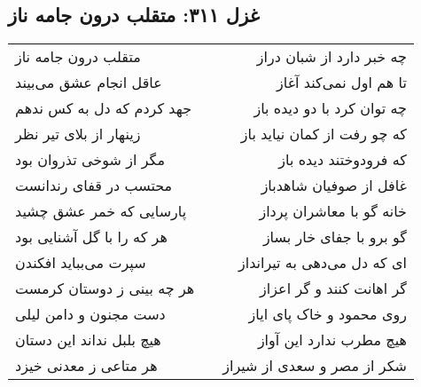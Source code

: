 \begin{center}
\section*{غزل ۳۱۱: متقلب درون جامه ناز}
\label{sec:311}
\begin{longtable}{l p{0.5cm} r}
متقلب درون جامه ناز
&&
چه خبر دارد از شبان دراز
\\
عاقل انجام عشق می‌بیند
&&
تا هم اول نمی‌کند آغاز
\\
جهد کردم که دل به کس ندهم
&&
چه توان کرد با دو دیده باز
\\
زینهار از بلای تیر نظر
&&
که چو رفت از کمان نیاید باز
\\
مگر از شوخی تذروان بود
&&
که فرودوختند دیده باز
\\
محتسب در قفای رندانست
&&
غافل از صوفیان شاهدباز
\\
پارسایی که خمر عشق چشید
&&
خانه گو با معاشران پرداز
\\
هر که را با گل آشنایی بود
&&
گو برو با جفای خار بساز
\\
سپرت می‌بباید افکندن
&&
ای که دل می‌دهی به تیرانداز
\\
هر چه بینی ز دوستان کرمست
&&
گر اهانت کنند و گر اعزاز
\\
دست مجنون و دامن لیلی
&&
روی محمود و خاک پای ایاز
\\
هیچ بلبل نداند این دستان
&&
هیچ مطرب ندارد این آواز
\\
هر متاعی ز معدنی خیزد
&&
شکر از مصر و سعدی از شیراز
\\
\end{longtable}
\end{center}
